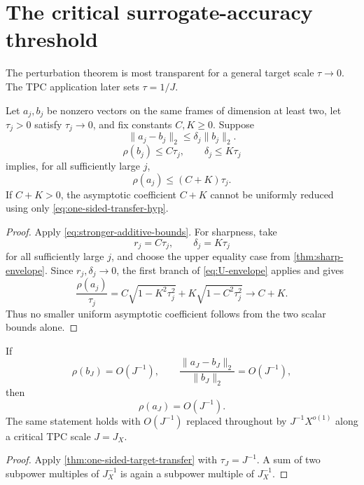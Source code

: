 \section{The critical surrogate-accuracy threshold}
\label{sec:critical-surrogate-threshold}

The perturbation theorem is most transparent for a general target
scale \(\tau\to0\).  The TPC application later sets
\(\tau=1/J\).

\begin{theorem}
\label{thm:one-sided-target-transfer}
Let \(a_j,b_j\) be nonzero vectors on the same frames of dimension
at least two, let \(\tau_j>0\) satisfy \(\tau_j\to0\), and fix
constants \(C,K\ge0\).  Suppose
\[
 \|a_j-b_j\|_2\le\delta_j\|b_j\|_2.
\]
\begin{equation}
 \rho(b_j)\le C\tau_j,\qquad
 \delta_j\le K\tau_j
\label{eq:one-sided-transfer-hyp}
\end{equation}
implies, for all sufficiently large \(j\),
\begin{equation}
 \boxed{
\rho(a_j)\le(C+K)\tau_j.}
\label{eq:one-sided-transfer-conc}
\end{equation}
If \(C+K>0\), the asymptotic coefficient \(C+K\) cannot be
uniformly reduced using only \eqref{eq:one-sided-transfer-hyp}.
\end{theorem}

\begin{proof}
Apply \eqref{eq:stronger-additive-bounds}.  For sharpness, take
\[
 r_j=C\tau_j,\qquad \delta_j=K\tau_j
\]
for all sufficiently large \(j\), and choose the upper equality
case from \cref{thm:sharp-envelope}.  Since \(r_j,\delta_j\to0\),
the first branch of \eqref{eq:U-envelope} applies and gives
\[
 \frac{\rho(a_j)}{\tau_j}
 =
 C\sqrt{1-K^2\tau_j^2}
 +K\sqrt{1-C^2\tau_j^2}
 \longrightarrow C+K.
\]
Thus no smaller uniform asymptotic coefficient follows from the two
scalar bounds alone.
\end{proof}

\begin{corollary}
\label{cor:J-sufficiency}
If
\[
 \rho(b_J)=O(J^{-1}),\qquad
 \frac{\|a_J-b_J\|_2}{\|b_J\|_2}=O(J^{-1}),
\]
then
\[
 \rho(a_J)=O(J^{-1}).
\]
The same statement holds with \(O(J^{-1})\) replaced throughout by
\(J^{-1}X^{o(1)}\) along a critical TPC scale \(J=J_X\).
\end{corollary}

\begin{proof}
Apply \cref{thm:one-sided-target-transfer} with
\(\tau_J=J^{-1}\).  A sum of two subpower multiples of \(J_X^{-1}\)
is again a subpower multiple of \(J_X^{-1}\).
\end{proof}

